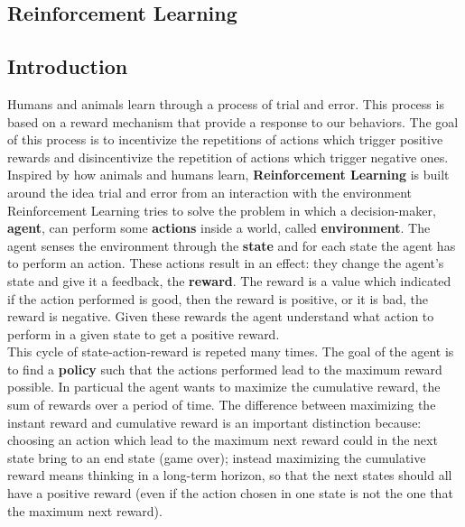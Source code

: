 \documentclass[14pt]{extarticle}
\def\sp{\vspace{5pt}}
\def\pp{\vspace{10pt}\newline}
\begin{document}
\newpage
\begin{center}
	\section{Reinforcement Learning}
\end{center}

\subsection{Introduction}
\sp
\begin{flushleft}
Humans and animals learn through a process of trial and error. This process is based on a reward mechanism that provide a response to our behaviors. The goal of this process is to incentivize the repetitions of actions which trigger positive rewards and disincentivize the repetition of actions which trigger negative ones.
\\
Inspired by how animals and humans learn, \textbf{Reinforcement Learning} is built around the idea trial and error from an interaction with the environment 
\pp
Reinforcement Learning tries to solve the problem in which a decision-maker, \textbf{agent}, can perform some \textbf{actions} inside a world, called \textbf{environment}. The agent senses the environment through the \textbf{state} and for each state the agent has to perform an action. These actions result in an effect: they change the agent's state and give it a feedback, the \textbf{reward}. The reward is a value which indicated if the action performed is good, then the reward is positive, or it is bad, the reward is negative. Given these rewards the agent understand what action to perform in a given state to get a positive reward. 
\\
This cycle of state-action-reward is repeted many times. The goal of the agent is to find a \textbf{policy} such that the actions performed lead to the maximum reward possible. In particual the agent wants to maximize the cumulative reward, the sum of rewards over a period of time. The difference between maximizing the instant reward and cumulative reward is an important distinction because: choosing an action which lead to the maximum next reward could in the next state bring to an end state (game over); instead maximizing the cumulative reward means thinking in a long-term horizon, so that the next states should all have a positive reward (even if the action chosen in one state is not the one that the
maximum next reward).


\end{flushleft}
\end{document}
